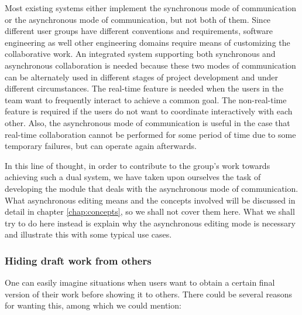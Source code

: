 Most existing systems either implement the synchronous mode of communication or the asynchronous
mode of communication, but not both of them. Since different user groups have different conventions
and requirements, software engineering as well other engineering domains require means of
customizing the collaborative work. An integrated system supporting both synchronous and
asynchronous collaboration is needed because these two modes of communication can be alternately
used in different stages of project development and under different circumstances. The real-time
feature is needed when the users in the team want to frequently interact to achieve a common
goal. The non-real-time feature is required if the users do not want to coordinate interactively
with each other. Also, the asynchronous mode of communication is useful in the case that
real-time collaboration cannot be performed for some period of time due to some temporary
failures, but can operate again afterwards.

In this line of thought, in order to contribute to the group's work towards achieving such a dual
system, we have taken upon ourselves the task of developing the module that deals with the asynchronous
mode of communication. What asynchronous editing means and the concepts involved will be discussed
in detail in chapter \ref{chap:concepts}, so we shall not cover them here. What we shall try to do
here instead is explain why the asynchronous editing mode is necessary and illustrate this with some
typical use cases.

\subsubsection{Hiding draft work from others}

One can easily imagine situations when users want to obtain a certain final version of their work
before showing it to others. There could be several reasons for wanting this, among which we could
mention:

